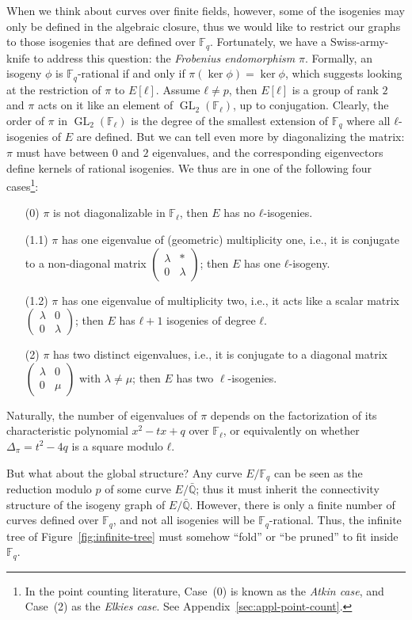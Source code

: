 \documentclass[10pt]{article}
\theoremstyle{plain}
\theoremstyle{definition}
\DeclareMathOperator{\GL}{GL}
\def\F{\ensuremath{\mathbb{F}}}
\def\mat#1{\left(\begin{smallmatrix}#1\end{smallmatrix}\right)}
\begin{document}
When we think about curves over finite fields, however, some of the
isogenies may only be defined in the algebraic closure, thus we would
like to restrict our graphs to those isogenies that are defined over
$\F_q$. %
Fortunately, we have a Swiss-army-knife to address this question: the
\emph{Frobenius endomorphism} $π$. %
Formally, an isogeny $ϕ$ is $\F_q$-rational if and only if
$π(\ker ϕ)=\ker ϕ$, which suggests looking at the restriction of $π$
to $E[ℓ]$. %
Assume $ℓ≠p$, then $E[ℓ]$ is a group of rank $2$ and $π$ acts on it
like an element of $\GL_2(\F_ℓ)$, up to conjugation. %
Clearly, the order of $π$ in $\GL_2(\F_ℓ)$ is the degree of the
smallest extension of $\F_q$ where all $ℓ$-isogenies of $E$ are
defined. %
But we can tell even more by diagonalizing the matrix: $π$ must have
between $0$ and $2$ eigenvalues, and the corresponding eigenvectors
define kernels of rational isogenies. %
We thus are in one of the following four cases\footnote{In the point
  counting literature, Case~(0) is known as the \emph{Atkin case}, and
  Case~(2) as the \emph{Elkies case}. See
  Appendix~\ref{sec:appl-point-count}.}:
\begin{itemize}
\item[(0)] $π$ is not diagonalizable in $\F_ℓ$, then $E$ has no
  $ℓ$-isogenies.
\item[(1.1)] $π$ has one eigenvalue of (geometric) multiplicity one,
  i.e., it is conjugate to a non-diagonal matrix
  $\mat{λ&*\\0&λ}$; then
  $E$ has one $ℓ$-isogeny.
\item[(1.2)] $π$ has one eigenvalue of multiplicity two, i.e., it acts
  like a scalar matrix
  $\mat{λ&0\\0&λ}$; then
  $E$ has $ℓ+1$ isogenies of degree $ℓ$.
\item[(2)] $π$ has two distinct eigenvalues, i.e., it is conjugate to
  a diagonal matrix
  $\mat{λ&0\\0&μ}$ with
  $\lambda\neq\mu$; then $E$ has two $\ell$-isogenies.
\end{itemize}

Naturally, the number of eigenvalues of $π$ depends on the
factorization of its characteristic polynomial $x^2-tx+q$ over $\F_ℓ$,
or equivalently on whether $Δ_π=t^2-4q$ is a square modulo $ℓ$. %

But what about the global structure? %
Any curve $E/\F_q$ can be seen as the reduction modulo $p$ of some
curve $E/\bar{ℚ}$; thus it must inherit the connectivity structure of
the isogeny graph of $E/\bar{ℚ}$. %
However, there is only a finite number of curves defined over $\F_q$,
and not all isogenies will be $\F_q$-rational. %
Thus, the infinite tree of Figure~\ref{fig:infinite-tree} must somehow
``fold'' or ``be pruned'' to fit inside $\F_q$. %
\end{document}

